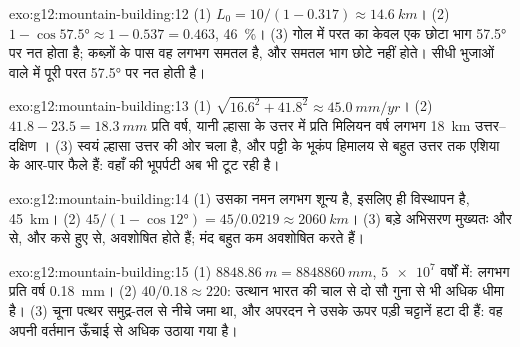 \begin{solution}{exo:g12:mountain-building:12}
(1) $L_0 = 10/(1 - 0.317) \approx \qty{14.6}{km}$। (2) $1 - \cos\ang{57.5}
\approx 1 - 0.537 = 0.463$, \qty{46}{\percent}। (3) गोल  में
परत का केवल एक छोटा भाग \ang{57.5} पर नत होता है; कब्ज़ों के पास वह
लगभग समतल है, और समतल भाग छोटे नहीं होते। सीधी भुजाओं वाले  में
पूरी परत \ang{57.5} पर नत होती है।
\end{solution}

\begin{solution}{exo:g12:mountain-building:13}
(1) $\sqrt{16.6^2 + 41.8^2} \approx \qty{45.0}{mm/yr}$। (2) $41.8 - 23.5 =
\qty{18.3}{mm}$ प्रति वर्ष, यानी ल्हासा के उत्तर में प्रति मिलियन वर्ष लगभग
\qty{18}{km} उत्तर--दक्षिण । (3) स्वयं ल्हासा उत्तर की ओर चला है, और
पट्टी के भूकंप हिमालय से बहुत उत्तर तक एशिया के आर-पार फैले हैं: वहाँ की
भूपर्पटी अब भी टूट रही है।
\end{solution}

\begin{solution}{exo:g12:mountain-building:14}
(1) उसका नमन लगभग शून्य है, इसलिए  ही विस्थापन है,
\qty{45}{km}। (2) $45/(1 - \cos\ang{12}) = 45/0.0219 \approx \qty{2060}{km}$।
(3) बड़े अभिसरण मुख्यतः  और  से, और कसे हुए  से,
अवशोषित होते हैं; मंद  बहुत कम अवशोषित करते हैं।
\end{solution}

\begin{solution}{exo:g12:mountain-building:15}
(1) $\qty{8848.86}{m} = \qty{8848860}{mm}$, $\num{5e7}$ वर्षों में: लगभग
प्रति वर्ष \qty{0.18}{mm}। (2) $40/0.18 \approx 220$: उत्थान भारत की चाल से दो सौ
गुना से भी अधिक धीमा है। (3) चूना पत्थर समुद्र-तल से नीचे जमा था,
और अपरदन ने उसके ऊपर पड़ी चट्टानें हटा दी हैं: वह अपनी वर्तमान ऊँचाई से
अधिक उठाया गया है।
\end{solution}

